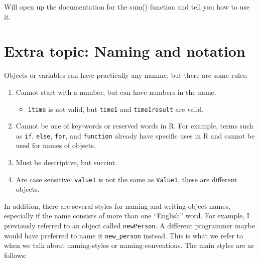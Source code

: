 \documentclass[]{book}
\providecommand{\tightlist}{%
  \setlength{\itemsep}{0pt}\setlength{\parskip}{0pt}}
\begin{document}
Will open up the documentation for the sum() function and tell you how to use it.

\hypertarget{extra-topic-naming-and-notation}{%
\section{Extra topic: Naming and notation}\label{extra-topic-naming-and-notation}}

Objects or variables can have practically any namme, but there are some rules:

\begin{enumerate}
\def\labelenumi{\arabic{enumi}.}
\tightlist
\item
  Cannot start with a number, but can have numbers in the name.

  \begin{itemize}
  \tightlist
  \item
    \texttt{1time} is not valid, but \texttt{time1} and \texttt{time1result} are valid.
  \end{itemize}
\item
  Cannot be one of key-words or reserved words in R. For example, terms such as \texttt{if}, \texttt{else}, \texttt{for}, and \texttt{function} already have specific uses in R and cannot be used for names of objects.
\item
  Must be descriptive, but succint.
\item
  Are case sensitive: \texttt{value1} is not the same as \texttt{Value1}, these are different objects.
\end{enumerate}

In addition, there are several styles for naming and writing object names, especially if the name consists of more than one ``English'' word. For example, I previously referred to an object called \texttt{newPerson}. A different programmer maybe would have preferred to name it \texttt{new\_person} instead. This is what we refer to when we talk about naming-styles or naming-conventions. The main styles are as follows:
\end{document}
